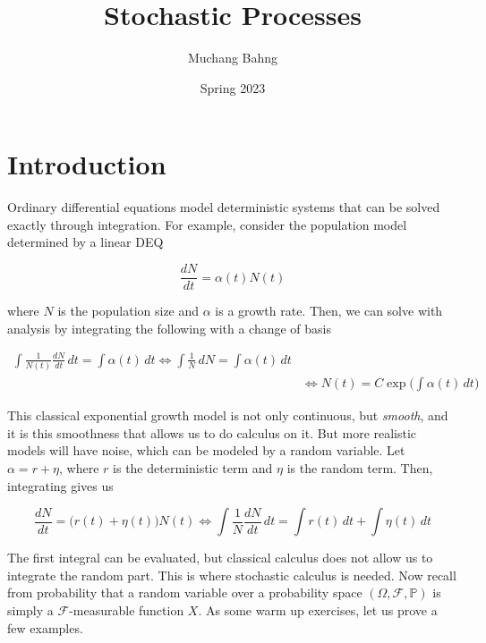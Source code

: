 \documentclass{article}
\begin{document}
\pagestyle{fancy}

\cfoot{\thepage / \pageref{LastPage}}

\title{Stochastic Processes}
\author{Muchang Bahng}
\date{Spring 2023}

\maketitle
\tableofcontents 
\pagebreak 

\section{Introduction}

  Ordinary differential equations model deterministic systems that can be solved exactly through integration. For example, consider the population model determined by a linear DEQ 

    \[\frac{d N} {dt} = \alpha(t) N (t)\]

  where $N$ is the population size and $\alpha$ is a growth rate. Then, we can solve with analysis by integrating the following with a change of basis

  \begin{align*}
    \int \frac{1}{N(t)} \frac{dN}{dt} \,dt = \int \alpha(t) \,dt \iff \int \frac{1}{N} \, dN = \int \alpha(t) \,dt \\
    & \iff N(t) = C \exp \bigg( \int \alpha (t) \,dt \bigg) 
  \end{align*}
  
  This classical exponential growth model is not only continuous, but \textit{smooth}, and it is this smoothness that allows us to do calculus on it. But more realistic models will have noise, which can be modeled by a random variable. Let $\alpha = r + \eta$, where $r$ is the deterministic term and $\eta$ is the random term. Then, integrating gives us 

    \[\frac{dN}{dt} = \big( r(t) + \eta(t) \big) N(t) \iff \int \frac{1}{N} \frac{dN}{dt} \,dt = \int r(t) \,dt + \int \eta(t) \,dt\]
    
  The first integral can be evaluated, but classical calculus does not allow us to integrate the random part. This is where stochastic calculus is needed. Now recall from probability that a random variable over a probability space $(\Omega, \mathcal{F}, \mathbb{P})$ is simply a $\mathcal{F}$-measurable function $X$. As some warm up exercises, let us prove a few examples. 
\end{document}
